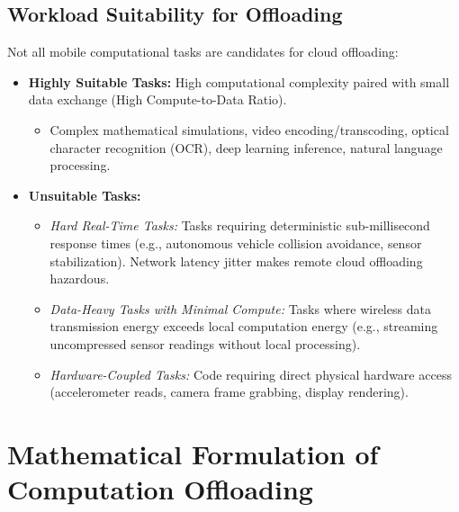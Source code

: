 \documentclass[11pt,a4paper,openany]{report}
\begin{document}
\subsection{Workload Suitability for Offloading}
Not all mobile computational tasks are candidates for cloud offloading:
\begin{itemize}[leftmargin=*]
  \item \textbf{Highly Suitable Tasks:} High computational complexity paired with small data exchange (High Compute-to-Data Ratio).
    \begin{itemize}
      \item Complex mathematical simulations, video encoding/transcoding, optical character recognition (OCR), deep learning inference, natural language processing.
    \end{itemize}
  \item \textbf{Unsuitable Tasks:}
    \begin{itemize}
      \item \emph{Hard Real-Time Tasks:} Tasks requiring deterministic sub-millisecond response times (e.g., autonomous vehicle collision avoidance, sensor stabilization). Network latency jitter makes remote cloud offloading hazardous.
      \item \emph{Data-Heavy Tasks with Minimal Compute:} Tasks where wireless data transmission energy exceeds local computation energy (e.g., streaming uncompressed sensor readings without local processing).
      \item \emph{Hardware-Coupled Tasks:} Code requiring direct physical hardware access (accelerometer reads, camera frame grabbing, display rendering).
    \end{itemize}
\end{itemize}

\section{Mathematical Formulation of Computation Offloading}
\end{document}
